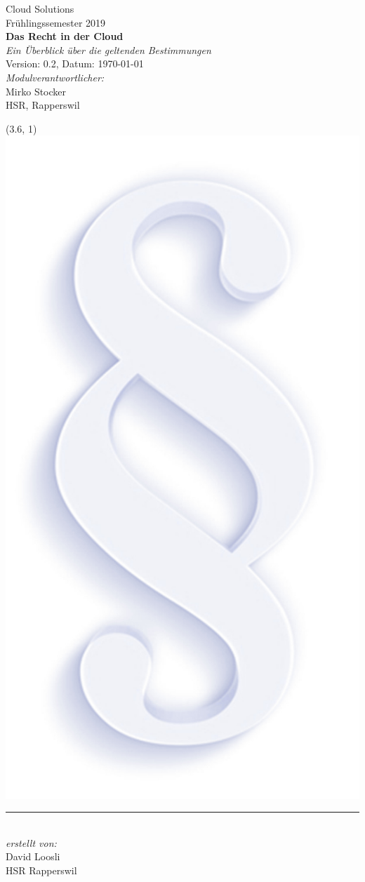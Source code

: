 \documentclass[a4paper,pointlessnumbers]{scrreprt}
\newcommand{\versionsnummer}{0.2}
\begin{document}
\begin{titlepage}
\centering
\vspace*{10mm}
\Large Cloud Solutions\\
\large Frühlingssemester 2019\\
\vspace*{30mm}
\Huge \textbf{Das Recht in der Cloud}\\
\Large \textit{Ein Überblick über die geltenden Bestimmungen}\\
\vspace*{2mm}
\large Version: \versionsnummer, Datum: \today\\
\vspace*{10mm}
\large {\itshape  Modulverantwortlicher:}\\
\large Mirko Stocker\\
\large HSR, Rapperswil\\[\baselineskip]
\begin{textblock}{4}(3.6, 1)
\includegraphics[width=0.5\linewidth]{juscloud}
\end{textblock}
\vfill
{\color{greycolor}\rule{0.5\textwidth}{0.4pt}}\\
\small \textit{erstellt von:}\\
\small David Loosli\\
\small HSR Rapperswil\\
\end{titlepage}
\end{document}
